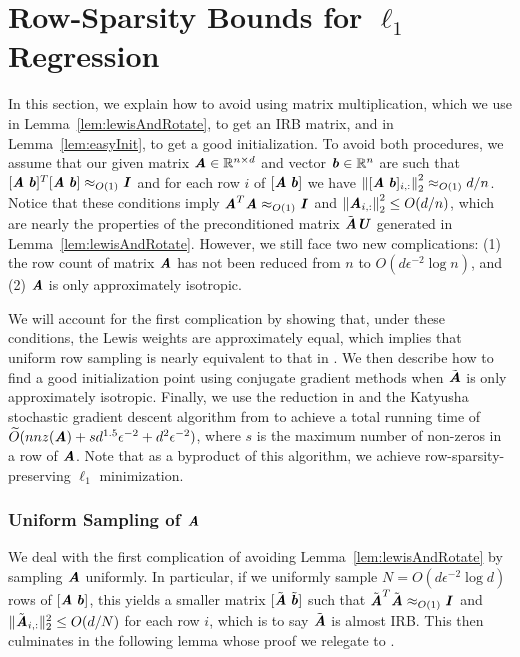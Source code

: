\section{Row-Sparsity Bounds for $\ell_1$ Regression}\label{sec:sparsitypreserve}
In this section, we explain how to avoid using matrix multiplication, which we use in Lemma~\ref{lem:lewisAndRotate}, to get an IRB matrix, and in Lemma~\ref{lem:easyInit}, to get a good initialization. To avoid both procedures, we assume that our given matrix $\AA \in \R^{n\times d}$ and vector $\bb \in \R^{n }$ are such that $[\AA\;\bb]^T [\AA\;\bb] \approx_{O(1)} \II$ and for each row $i$ of $[\AA\;\bb]$ we have $\norme{[\AA\;\bb]_{i,:}}^2 \approx_{O(1)} d/n$. Notice that these conditions imply $\AA^T\AA \approx_{O(1)} \II$ and $\norme{\AA_{i,:}}^2 \leq O(d/n)$, which are nearly the properties of the preconditioned matrix $\tilde{\AA}\UU$ generated in Lemma~\ref{lem:lewisAndRotate}. However, we still face two new complications: (1) the row count of matrix $\AA$ has not been reduced from $n$ to $O(d\epsilon^{-2}\log{n})$, and (2) $\AA$ is only approximately isotropic.

We will account for the first complication by showing that, under these conditions, the Lewis weights are approximately equal, which implies that uniform row sampling is nearly equivalent to that in . 
We then describe how to find a good initialization point using conjugate gradient methods when $\tilde{\AA}$ is only approximately isotropic. 
Finally, we use the reduction in \cite{AllenZhuH16} and the Katyusha stochastic gradient descent algorithm from \cite{AllenZhu17} to achieve a total running time of $\Otil(nnz(\AA) + sd^{1.5}\epsilon^{-2} + d^2\epsilon^{-2})$, where $s$ is the maximum number of non-zeros in a row of $\AA$. Note that as a byproduct of this algorithm, we achieve row-sparsity-preserving $\ell_1$ minimization.


\subsubsection*{Uniform Sampling of $\AA$}
We deal with the first complication of avoiding Lemma~\ref{lem:lewisAndRotate} by sampling $\AA$ uniformly. In particular, if we uniformly sample $N = O(d\epsilon^{-2} \log d)$ rows of $[\AA\;\bb]$, this yields a smaller matrix $[\tilde{\AA}\;\tilde{\bb}]$ such that $\tilde{\AA}^T\tilde{\AA} \approx_{O(1)} \II$ and $\|\tilde{\AA}_{i,:}\|_2^2 \leq  O(d/N)$ for each row $i$, which is to say $\tilde{\AA}$ is almost IRB. This then culminates in the following lemma whose proof we relegate to .

